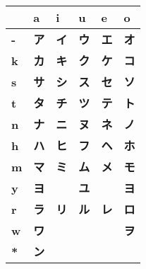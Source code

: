 


\newcommand{\sbf}[1]{\smallskip\textbf{#1}}

\bigskip
\begin{center}
\Huge


\begin{tabular}{m{1.0cm}||m{1.0cm}|m{1.0cm}|m{1.0cm}|m{1.0cm}|m{1.0cm}|}
& \textbf{a}& \textbf{i}& \textbf{u}& \textbf{e}& \textbf{o}\\ \hline \hline
\textbf{-}&\sbf{ア}&\sbf{イ}&\sbf{ウ}&\sbf{エ}&\sbf{オ}\\ \hline
\textbf{k}&\sbf{カ}&\sbf{キ}&\sbf{ク}&\sbf{ケ}&\sbf{コ}\\ \hline
\textbf{s}&\sbf{サ}&\sbf{シ}&\sbf{ス}&\sbf{セ}&\sbf{ソ}\\ \hline
\textbf{t}&\sbf{タ}&\sbf{チ}&\sbf{ツ}&\sbf{テ}&\sbf{ト}\\ \hline
\textbf{n}&\sbf{ナ}&\sbf{ニ}&\sbf{ヌ}&\sbf{ネ}&\sbf{ノ}\\ \hline
\textbf{h}&\sbf{ハ}&\sbf{ヒ}&\sbf{フ}&\sbf{ヘ}&\sbf{ホ}\\ \hline
\textbf{m}&\sbf{マ}&\sbf{ミ}&\sbf{ム}&\sbf{メ}&\sbf{モ}\\ \hline
\textbf{y}&\sbf{ヨ}&\sbf{  }&\sbf{ユ}&\sbf{  }&\sbf{ヨ}\\ \hline
\textbf{r}&\sbf{ラ}&\sbf{リ}&\sbf{ル}&\sbf{レ}&\sbf{ロ}\\ \hline
\textbf{w}&\sbf{ワ}&\sbf{  }&\sbf{  }&\sbf{  }&\sbf{ヲ}\\ \hline
\textbf{*}&\sbf{ン}&\sbf{  }&\sbf{  }&\sbf{  }&\sbf{  }\\ \hline
\end{tabular}
\end{center}
